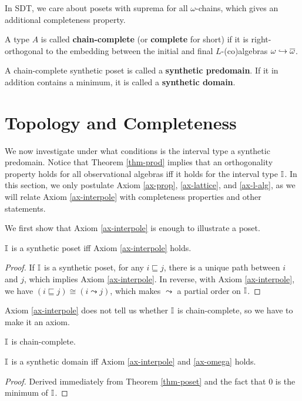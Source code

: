 In SDT, we care about posets with suprema for all $\omega$-chains, which gives an additional completeness property.
\begin{definition}
    A type $A$ is called \textbf{chain-complete} (or \textbf{complete} for short) if it is right-orthogonal to the embedding between the initial and final $L$-(co)algebras $\omega\hookrightarrow\overline{\omega}$.
\end{definition}
A chain-complete synthetic poset is called a \textbf{synthetic predomain}. If it in addition contains a minimum, it is called a \textbf{synthetic domain}.

\section{Topology and Completeness}
We now investigate under what conditions is the interval type a synthetic predomain. Notice that Theorem \ref{thm-prod} implies that an orthogonality property holds for all observational algebras iff it holds for the interval type $\mathbb{I}$. In this section, we only postulate Axiom \ref{ax-prop}, \ref{ax-lattice}, and \ref{ax-l-alg}, as we will relate Axiom \ref{ax-interpole} with completeness properties and other statements.

We first show that Axiom \ref{ax-interpole} is enough to illustrate a poset.
\begin{theorem}
    \label{thm-poset}
    $\mathbb{I}$ is a synthetic poset iff Axiom \ref{ax-interpole} holds.
\end{theorem}
\begin{proof}
    If $\mathbb{I}$ is a synthetic poset, for any $i\sqsubseteq j$, there is a unique path between $i$ and $j$, which implies Axiom \ref{ax-interpole}. In reverse, with Axiom \ref{ax-interpole}, we have $(i\sqsubseteq j)\cong(i\leadsto j)$, which makes $\leadsto$ a partial order on $\mathbb{I}$.
\end{proof}
Axiom \ref{ax-interpole} does not tell us whether $\mathbb{I}$ is chain-complete, so we have to make it an axiom.
\begin{axiom}
    \label{ax-omega}
    $\mathbb{I}$ is chain-complete.
\end{axiom}
\begin{theorem}
    \label{thm-domain}
    $\mathbb{I}$ is a synthetic domain iff Axiom \ref{ax-interpole} and \ref{ax-omega} holds.
\end{theorem}
\begin{proof}
    Derived immediately from Theorem \ref{thm-poset} and the fact that $0$ is the minimum of $\mathbb{I}$.
\end{proof}

